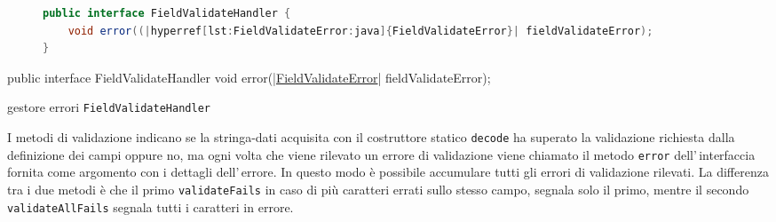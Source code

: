 \ifesource
\begin{figure*}[!htb]
\begin{lstlisting}[language=java, 
caption={gestore errori \texttt{FieldValidateHandler}}, 
label=lst:FieldValidateHandler:java]
public interface FieldValidateHandler {
    void error((|hyperref[lst:FieldValidateError:java]{FieldValidateError}| fieldValidateError);
}
\end{lstlisting}
\end{figure*}
\else
\begin{elisting}[!htb]
\begin{javacode}
public interface FieldValidateHandler {
    void error(|\hyperref[lst:FieldValidateError:java]{FieldValidateError}| fieldValidateError);
}
\end{javacode}
\caption{gestore errori \texttt{FieldValidateHandler}}
\label{lst:FieldValidateHandler:java}
\end{elisting}
\fi

I metodi di validazione indicano se la stringa-dati
acquisita con il costruttore statico \texttt{decode} ha superato la validazione
richiesta dalla definizione dei campi oppure no, ma ogni volta che viene 
rilevato un errore di validazione viene chiamato il metodo \texttt{error}
dell'\,interfaccia fornita come argomento con i dettagli dell'\,errore.
In questo modo è possibile accumulare tutti gli errori di validazione rilevati.
La differenza tra i due metodi è che il primo \texttt{validateFails} in caso di
più caratteri errati sullo stesso campo, segnala solo il primo, mentre il 
secondo \texttt{validateAllFails} segnala tutti i caratteri in errore.

